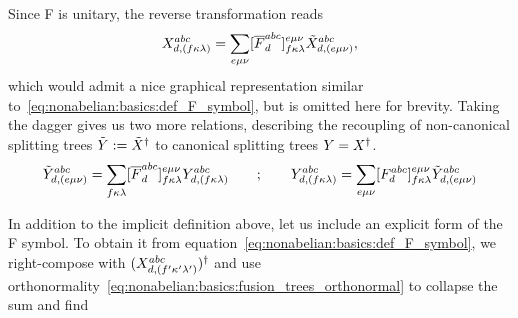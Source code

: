 Since F is unitary, the reverse transformation reads
\begin{equation}
    \label{eq:nonabelian:basics:F_symbol_reverse}
    X^{abc}_{d,{(f\kappa\lambda)}}
    = \sum_{{e\mu\nu}} [ \overline{F}^{abc}_d ]^{{e\mu\nu}}_{{f\kappa\lambda}}
    \tilde{X}^{abc}_{d,{(e\mu\nu)}}
    ,
\end{equation}
which would admit a nice graphical representation similar to~\eqref{eq:nonabelian:basics:def_F_symbol}, but is omitted here for brevity.
%
Taking the dagger gives us two more relations, describing the recoupling of non-canonical splitting trees $\tilde{Y} := \tilde{X}^\dagger$ to canonical splitting trees $Y = X^\dagger$.
\begin{equation}
    \label{eq:nonabelian:basics:F_symbol_dagger}
    \tilde{Y}^{abc}_{d,{(e\mu\nu)}}
    = \sum_{{f\kappa\lambda}}  [ \overline{F}^{abc}_d ]^{{e\mu\nu}}_{{f\kappa\lambda}}
    Y^{abc}_{d,{(f\kappa\lambda)}}
    \qquad ; \qquad
    Y^{abc}_{d,{(f\kappa\lambda)}}
    = \sum_{{e\mu\nu}} [ F^{abc}_d ]^{{e\mu\nu}}_{{f\kappa\lambda}}
    \tilde{Y}^{abc}_{d,{(e\mu\nu)}}
\end{equation}

In addition to the implicit definition above, let us include an explicit form of the F symbol.
%
To obtain it from equation~\eqref{eq:nonabelian:basics:def_F_symbol}, we right-compose with $(X^{abc}_{d,(f'\kappa'\lambda')})^\dagger$ and use orthonormality~\eqref{eq:nonabelian:basics:fusion_trees_orthonormal} to collapse the sum and find

